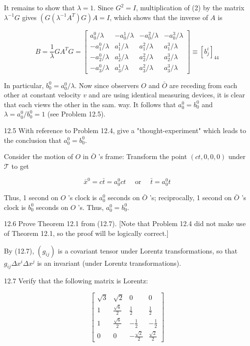 \documentclass[10pt]{article}
\begin{document}
It remains to show that $\lambda=1$. Since $G^{2}=I$, multiplication of (2) by the matrix $\lambda^{-1} G$ gives $\left(G\left(\lambda^{-1} A^{T}\right) G\right) A=I$, which shows that the inverse of $A$ is

\[
B=\frac{1}{\lambda} G A^{T} G=\left[\begin{array}{rrrr}
a_{0}^{0} / \lambda & -a_{0}^{1} / \lambda & -a_{0}^{2} / \lambda & -a_{0}^{3} / \lambda  \tag{3}\\
-a_{1}^{0} / \lambda & a_{1}^{1} / \lambda & a_{1}^{2} / \lambda & a_{1}^{3} / \lambda \\
-a_{2}^{0} / \lambda & a_{2}^{1} / \lambda & a_{2}^{2} / \lambda & a_{2}^{3} / \lambda \\
-a_{3}^{0} / \lambda & a_{3}^{1} / \lambda & a_{3}^{2} / \lambda & a_{3}^{3} / \lambda
\end{array}\right] \equiv\left[b_{j}^{i}\right]_{44}
\]

In particular, $b_{0}^{0}=a_{0}^{0} / \lambda$. Now since observers $O$ and $\bar{O}$ are receding from each other at constant velocity $v$ and are using identical measuring devices, it is clear that each views the other in the sam. way. It follows that $a_{0}^{0}=b_{0}^{0}$ and $\lambda=a_{0}^{0} / b_{0}^{0}=1$ (see Problem 12.5).

12.5 With reference to Problem 12.4, give a "thought-experiment" which leads to the conclusion that $a_{0}^{0}=b_{0}^{0}$.

Consider the motion of $O$ in $\bar{O}$ 's frame: Transform the point $(c t, 0,0,0)$ under $\mathscr{T}$ to get

$$
\bar{x}^{0}=c \bar{t}=a_{0}^{0} c t \quad \text { or } \quad \bar{t}=a_{0}^{0} t
$$

Thus, 1 second on $O$ 's clock is $a_{0}^{0}$ seconds on $\bar{O}$ 's; reciprocally, 1 second on $\bar{O}$ 's clock is $b_{0}^{0}$ seconds on $O$ 's. Thus, $a_{0}^{0}=b_{0}^{0}$.

12.6 Prove Theorem 12.1 from (12.7). [Note that Problem 12.4 did not make use of Theorem 12.1, so the proof will be logically correct.]

By (12.7), $\left(g_{i j}\right)$ is a covariant tensor under Lorentz transformations, so that $g_{i j} \Delta x^{i} \Delta x^{j}$ is an invariant (under Lorentz transformations).

12.7 Verify that the following matrix is Lorentz:

$$
\left[\begin{array}{cccc}
\sqrt{3} & \sqrt{2} & 0 & 0 \\
1 & \frac{\sqrt{6}}{2} & \frac{1}{2} & \frac{1}{2} \\
1 & \frac{\sqrt{6}}{2} & -\frac{1}{2} & -\frac{1}{2} \\
0 & 0 & -\frac{\sqrt{2}}{2} & \frac{\sqrt{2}}{2}
\end{array}\right]
$$
\end{document}
